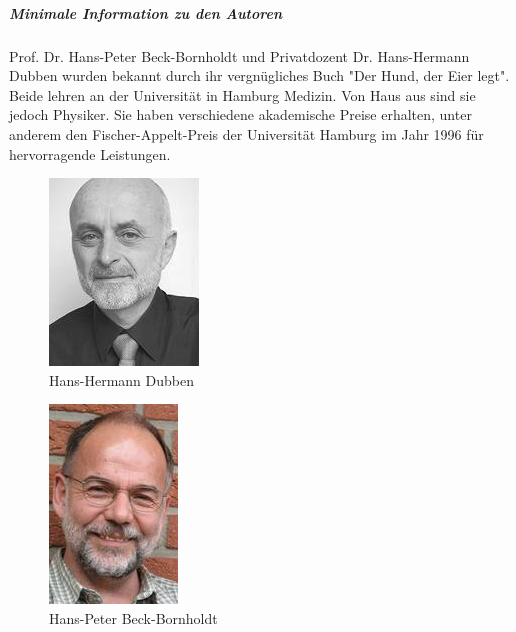 \documentclass{article}
\begin{document}
\subparagraph {\large Minimale Information zu den Autoren}\newline
\newline
\begin{flushleft} \newline 
Prof. Dr. Hans-Peter Beck-Bornholdt und Privatdozent Dr. Hans-Hermann Dubben wurden bekannt durch ihr vergn\"{u}gliches Buch "Der Hund, der Eier legt". Beide lehren an der Universit\"{a}t in Hamburg Medizin. Von Haus aus sind sie jedoch Physiker. Sie haben verschiedene akademische Preise erhalten, unter anderem den Fischer-Appelt-Preis der Universit\"{a}t Hamburg im Jahr 1996 f\"{u}r hervorragende Leistungen.
\end{flushleft}
\begin{figure}[h]
	\centering
		\includegraphics{dubben.jpg}
	\caption{Hans-Hermann Dubben}
	\label{fig:dubben}
\end{figure}
\begin{figure}[h]
	\centering
		\includegraphics{bebo.jpg}
		\caption{Hans-Peter Beck-Bornholdt}
	\label{fig:bebo}
\end{figure}
\newpage
\end{document}
